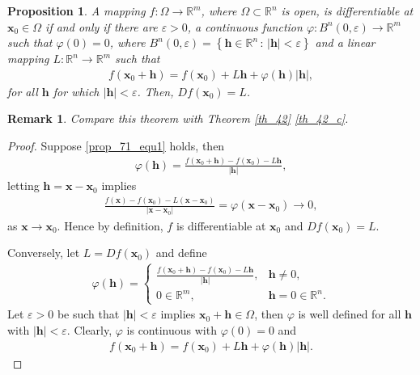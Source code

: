 \documentclass[10pt]{book}
\newtheorem{proposition}{Proposition}[chapter]
\newtheorem{remark}{Remark}[chapter]
\theoremstyle{definition}
\numberwithin{equation}{chapter}
\begin{document}
\begin{proposition}\label{prop_71}
A mapping $f: \Omega \to \mathbb{R}^m$, where $\Omega \subset \mathbb{R}^n$ is open, is differentiable at $\mathbf{x}_0 \in \Omega$ if and only if there are $\varepsilon > 0$, a continuous function $\varphi: B^n(0,\varepsilon) \to \mathbb{R}^m$ such that $\varphi(0) = 0$, where $B^n(0,\varepsilon) = \left\{\mathbf{h} \in \mathbb{R}^n \,:\, \left|\mathbf{h}\right| < \varepsilon\right\}$ and a linear mapping $L: \mathbb{R}^n \to \mathbb{R}^m$ such that
\begin{align}\label{prop_71_equ1}
    f(\mathbf{x}_0 + \mathbf{h}) = f(\mathbf{x}_0) + L\mathbf{h} + \varphi(\mathbf{h}) \left|\mathbf{h}\right|,
\end{align}
for all $\mathbf{h}$ for which $\left|\mathbf{h}\right| < \varepsilon$. Then, $Df(\mathbf{x}_0) = L$.
\end{proposition}
\begin{remark}
Compare this theorem with Theorem \ref{th_42} \ref{th_42_c}.
\end{remark}
\begin{proof}
Suppose \ref{prop_71_equ1} holds, then
\begin{align*}
    \varphi(\mathbf{h}) = \frac{f(\mathbf{x}_0 + \mathbf{h}) - f(\mathbf{x}_0) - L\mathbf{h}}{\left|\mathbf{h}\right|},
\end{align*}
letting $\mathbf{h} = \mathbf{x} - \mathbf{x}_0$ implies
\begin{align*}
    \frac{f(\mathbf{x}) - f(\mathbf{x}_0) - L(\mathbf{x} - \mathbf{x}_0)}{\left|\mathbf{x} - \mathbf{x}_0\right|} = \varphi(\mathbf{x} - \mathbf{x}_0) \to 0,
\end{align*}
as $\mathbf{x} \to \mathbf{x}_0$. Hence by definition, $f$ is differentiable at $\mathbf{x}_0$ and $Df(\mathbf{x}_0) = L$.

Conversely, let $L = Df(\mathbf{x}_0)$ and define 
\begin{align*}
    \varphi(\mathbf{h}) = \begin{cases}
        \frac{f(\mathbf{x}_0 + \mathbf{h}) - f(\mathbf{x}_0) - L\mathbf{h}}{\left|\mathbf{h}\right|}, & \mathbf{h} \neq 0, \\
        0 \in \mathbb{R}^m, & \mathbf{h} = 0 \in \mathbb{R}^n.
    \end{cases}
\end{align*}
Let $\varepsilon > 0$ be such that $\left|\mathbf{h}\right| < \varepsilon$ implies $\mathbf{x}_0 + \mathbf{h} \in \Omega$, then $\varphi$ is well defined for all $\mathbf{h}$ with $\left|\mathbf{h}\right| < \varepsilon$. Clearly, $\varphi$ is continuous with $\varphi(0) = 0$ and
\begin{align*}
    f(\mathbf{x}_0 + \mathbf{h}) = f(\mathbf{x}_0) + L\mathbf{h} + \varphi(\mathbf{h}) \left|\mathbf{h}\right|.
\end{align*}
\end{proof}
\end{document}
